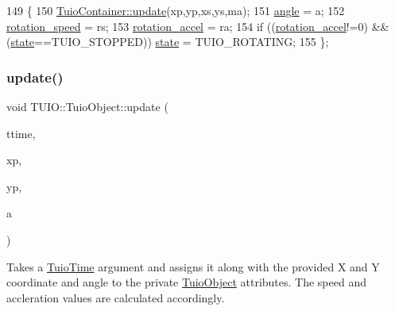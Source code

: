 \begin{DoxyCode}
149                                                                                                     \{
150             \hyperlink{class_t_u_i_o_1_1_tuio_container_a20d5b3bd52eb41a58c313cc8ceda68c0}{TuioContainer::update}(xp,yp,xs,ys,ma);
151             \hyperlink{class_t_u_i_o_1_1_tuio_object_a1c5652a3ee1175156f13777f0d8068ee}{angle} = a;
152             \hyperlink{class_t_u_i_o_1_1_tuio_object_aee8d80d314a66646b834b2d74e0073d1}{rotation\_speed} = rs;
153             \hyperlink{class_t_u_i_o_1_1_tuio_object_a793a29a0bf9fd2f1becdb9d2d45fc463}{rotation\_accel} = ra;
154             \textcolor{keywordflow}{if} ((\hyperlink{class_t_u_i_o_1_1_tuio_object_a793a29a0bf9fd2f1becdb9d2d45fc463}{rotation\_accel}!=0) && (\hyperlink{class_t_u_i_o_1_1_tuio_container_a61cfc66997d3d2f2a503e20bd29ddbf1}{state}==TUIO\_STOPPED)) 
      \hyperlink{class_t_u_i_o_1_1_tuio_container_a61cfc66997d3d2f2a503e20bd29ddbf1}{state} = TUIO\_ROTATING;
155         \};
\end{DoxyCode}
\mbox{\label{class_t_u_i_o_1_1_tuio_object_aaa516e0bc2c7bf5ed9ed3f94f0cb86df}} 
\subsubsection{\texorpdfstring{update()}{update()}\hspace{0.1cm}{\footnotesize\ttfamily [3/4]}}
{\footnotesize\ttfamily void T\+U\+I\+O\+::\+Tuio\+Object\+::update (\begin{DoxyParamCaption}\item[{\hyperlink{class_t_u_i_o_1_1_tuio_time}{Tuio\+Time}}]{ttime,  }\item[{float}]{xp,  }\item[{float}]{yp,  }\item[{float}]{a }\end{DoxyParamCaption})\hspace{0.3cm}{\ttfamily [inline]}}

Takes a \hyperlink{class_t_u_i_o_1_1_tuio_time}{Tuio\+Time} argument and assigns it along with the provided X and Y coordinate and angle to the private \hyperlink{class_t_u_i_o_1_1_tuio_object}{Tuio\+Object} attributes. The speed and accleration values are calculated accordingly.


